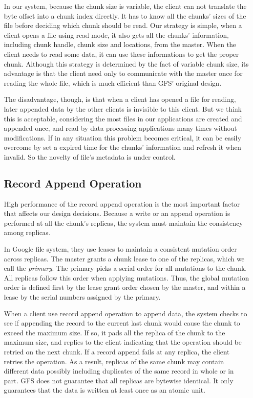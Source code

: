 \documentclass[letterpaper,twocolumn,10pt]{article}
\begin{document}
In our system, because the chunk size is variable, the client can not translate the byte offset into a chunk index directly. It has to know all the chunks' sizes of the file before deciding which chunk should be read. Our strategy is simple, when a client opens a file using read mode, it also gets all the chunks' information, including chunk handle, chunk size and locations, from the master. When the client needs to read some data, it can use these informations to get the proper chunk. Although this strategy is determined by the fact of variable chunk size, its advantage is that the client need only to communicate with the master once for reading the whole file, which is much efficient than GFS' original design.

The disadvantage, though, is that when a client has opened a file for reading, later appended data by the other clients is invisible to this client. But we think this is acceptable, considering the most files in our applications are created and appended once, and read by data processing applications many times without modifications. If in any situation this problem becomes critical, it can be easily overcome by set a expired time for the chunks' information and refresh it when invalid. So the novelty of file's metadata is under control. 
\subsection{Record Append Operation}
High performance of the record append operation is the most important factor that affects our design decisions. Because a write or an append operation is performed at all the chunk's replicas, the system must maintain the consistency among replicas. 


In Google file system, they use leases to maintain a consistent mutation order across replicas. The master grants a chunk lease to one of the replicas, which we call the \emph{primary}. The primary picks a serial order for all mutations to the chunk. All replicas follow this order when applying mutations. Thus, the global mutation order is defined first by the lease grant order chosen by the master, and within a lease by the serial numbers assigned by the primary.

When a client use record append operation to append data, the system checks to see if appending the record to the current last chunk would cause the chunk to exceed the maximum size. If so, it pads all the replica of the chunk to the maximum size, and replies to the client indicating that the operation should be retried on the next chunk. If a record append fails at any replica, the client retries the operation. As a result, replicas of the same chunk may contain different data possibly including duplicates of the same record in whole or in part. GFS does not guarantee that all replicas are bytewise identical. It only guarantees that the data is written at least once as an atomic unit. 
\end{document}
